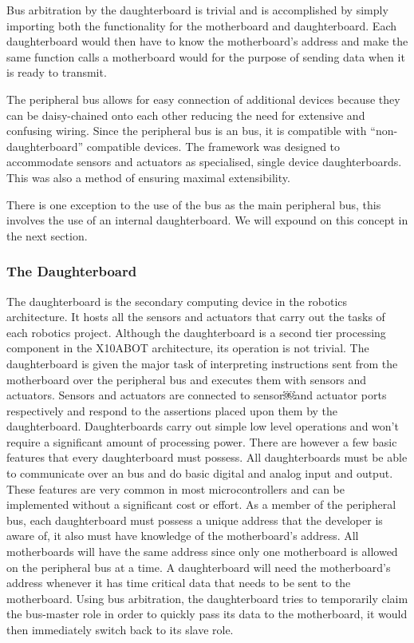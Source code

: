 	Bus arbitration by the daughterboard is trivial and is accomplished by simply importing both the functionality for the motherboard and daughterboard. Each daughterboard would then have to know the motherboard's \iic address and make the same function calls a motherboard would for the purpose of sending data when it is ready to transmit.
	
	The peripheral bus allows for easy connection of additional devices because they can be daisy-chained onto each other reducing the need for extensive and confusing wiring. Since the peripheral bus is an \iic bus, it is compatible with ``non-daughterboard'' \iic compatible devices. The framework was designed to accommodate sensors and actuators as specialised, single device daughterboards. This was also a method of ensuring maximal extensibility.
	
	There is one exception to the use of the \iic bus as the main peripheral bus, this involves the use of an internal daughterboard. We will expound on this concept in the next section.




	
	\subsubsection{The Daughterboard} %
	\label{ssub:the_daughterboard}
	The daughterboard is the secondary computing device in the \xten robotics architecture. It hosts all the sensors and actuators that carry out the tasks of each robotics project. Although the daughterboard is a second tier processing component in the X10ABOT architecture, its operation is not trivial. The daughterboard is given the major task of interpreting instructions sent from the motherboard over the peripheral bus and executes them with sensors and actuators. Sensors and actuators are connected to sensor￼and actuator ports respectively and respond to the assertions placed upon them by the daughterboard. Daughterboards carry out simple low level operations and won't require a significant amount of processing power. There are however a few basic features that every daughterboard must possess. All daughterboards must be able to communicate over an \iic bus and do basic digital and analog input and output. These features are very common in most microcontrollers and can be implemented without a significant cost or effort.
	As a member of the peripheral bus, each daughterboard must possess a unique address that the developer is aware of, it also must have knowledge of the motherboard's address. All motherboards will have the same address since only one motherboard is allowed on the peripheral bus at a time. A daughterboard will need the motherboard's address whenever it has time critical data that needs to be sent to the motherboard. Using bus arbitration, the daughterboard tries to temporarily claim the bus-master role in order to quickly pass its data to the motherboard, it would then immediately switch back to its slave role.
